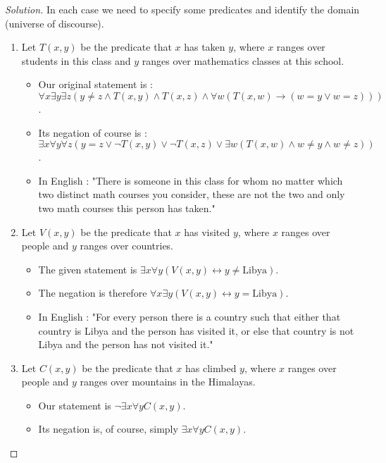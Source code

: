 \documentclass{article}
\newenvironment{solution}{\renewcommand\qedsymbol{}\begin{proof}[Solution]}{\end{proof}}
\begin{document}
\begin{solution}
In each case we need to specify some predicates and identify the domain (universe of discourse). 

\begin{enumerate}[leftmargin=16pt, topsep = 8pt]
\item  Let $T(x,y)$ be the predicate that $x$ has taken $y$, where $x$ ranges over students in this class and $y$ ranges over mathematics classes at this school.
\begin{itemize}[leftmargin=0pt, topsep = 0pt]
\item Our original statement is :\\$\forall x \exists y \exists z(y \neq z \land T(x,y) \land T(x,z) \land \forall w(T(x,w) \rightarrow (w = y \lor w = z)))$.
\item Its negation of course is :\\$\exists x \forall y \forall z(y = z \lor \neg T(x,y) \lor \neg T(x,z) \lor \exists w(T(x,w) \land w \neq y \land w \neq z))$.
\item In English : "There is someone in this class for whom no matter which two distinct math courses you consider, these are not the two and only two math courses this person has taken."
\end{itemize}
\item Let $V(x,y)$ be the predicate that $x$ has visited $y$, where $x$ ranges over people and $y$ ranges over countries.
\begin{itemize}[leftmargin=0pt, topsep = 0pt]
\item The given statement is $\exists x \forall y(V(x,y) \leftrightarrow y \neq \textrm{Libya})$.
\item The negation is therefore $\forall x \exists y(V(x,y) \leftrightarrow y = \textrm{Libya})$.
\item In English : "For every person there is a country such that either that country is Libya and the person has visited it, or else that country is not Libya and the person has not visited it."
\end{itemize}
\item Let $C(x,y)$ be the predicate that $x$ has climbed $y$, where $x$ ranges over people and $y$ ranges over mountains in the Himalayas.
\begin{itemize}[leftmargin=0pt, topsep = 0pt]
\item Our statement is $\neg \exists x \forall yC(x,y)$.
\item Its negation is, of course, simply $\exists x \forall yC(x,y)$.

\end{itemize}
\end{enumerate}
\end{solution}
\end{document}
